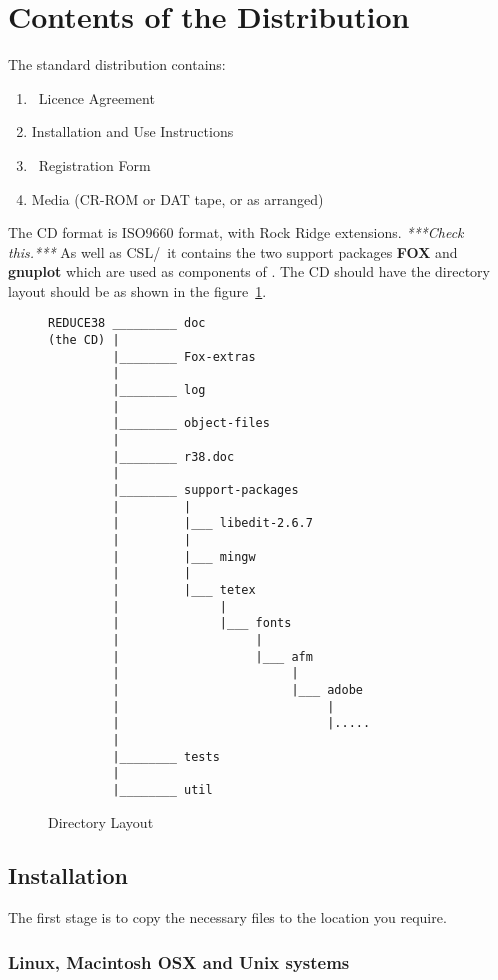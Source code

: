 \section{Contents of the Distribution}

The standard distribution contains:

\begin{enumerate}
\item \REDUCE\  Licence Agreement
\item Installation and Use Instructions
\item \REDUCE\  Registration Form
\item Media (CR-ROM or DAT tape, or as arranged)
\end{enumerate}

The CD format is ISO9660 format, with Rock Ridge extensions. {\em
  ***Check this.***}  As well as CSL/\REDUCE\  it contains the two support
  packages {\bf FOX} and {\bf gnuplot} which are used as components of
  \REDUCE.  The CD should have the directory layout should be as shown
  in the figure~\ref{dir}.

\begin{figure}
\label{dir}
\begin{verbatim}
REDUCE38 _________ doc
(the CD) |
         |________ Fox-extras
         |
         |________ log
         |
         |________ object-files
         |
         |________ r38.doc
         |
         |________ support-packages
         |         |
         |         |___ libedit-2.6.7
         |         |
         |         |___ mingw
         |         |
         |         |___ tetex
         |              |
         |              |___ fonts
         |                   |
         |                   |___ afm
         |                        |
         |                        |___ adobe
         |                             |
         |                             |.....
         |
         |________ tests
         |
         |________ util

\end{verbatim}
\caption{Directory Layout}
\end{figure}

\subsection{Installation}

The first stage is to copy the necessary files to the location you
require.

\subsubsection{Linux, Macintosh OSX and Unix systems}

